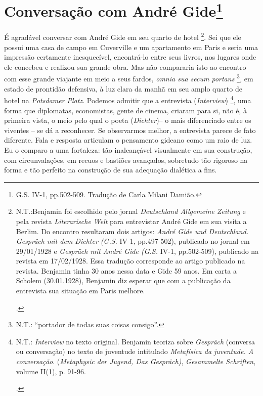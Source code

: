 \chapter{Conversação com André Gide\footnote[*]{G.S. IV-1, pp.502-509. Tradução de
  Carla Milani Damião.}}

É agradável conversar com André Gide em seu quarto de hotel \footnote{N.T.:Benjamin
  foi escolhido pelo jornal \emph{Deutschland Allgemeine Zeitung} e pela
  revista \emph{Literarische Welt} para entrevistar André Gide em sua
  visita a Berlim. Do encontro resultaram dois artigos: \emph{André Gide
  und Deutschland. Gespräch mit dem Dichter (G.S.} IV-1, pp.497-502),
  publicado no jornal em 29/01/1928 e \emph{Gespräch mit André Gide
  (G.S.} IV-1, pp.502-509), publicado na revista em 17/02/1928. Essa
  tradução corresponde ao artigo publicado na revista. Benjamin tinha 30
  anos nessa data e Gide 59 anos. Em carta a Scholem (30.01.1928),
  Benjamin diz esperar que com a publicação da entrevista sua situação
  em Paris melhore.

  .}. Sei que ele possui uma casa de campo em Cuverville e um
apartamento em Paris e seria uma impressão certamente inesquecível,
encontrá-lo entre seus livros, nos lugares onde ele concebeu e realizou
sua grande obra. Mas não compararia isto ao encontro com esse grande
viajante em meio a seus fardos, \emph{omnia sua secum portans}
\footnote{N.T.: ``portador de todas suas coisas consigo''.}\emph{,} em
estado de prontidão defensiva, à luz clara da manhã em seu amplo quarto
de hotel na \emph{Potsdamer Platz}. Podemos admitir que a entrevista
(\emph{Interview}) \footnote{N.T.: \emph{Interview} no texto original.
  Benjamin teoriza sobre \emph{Gespräch} (conversa ou conversação) no
  texto de juventude intitulado \emph{Metafísica da juventude. A
  conversação}. (\emph{Metaphysic der Jugend, Das Gespräch)},
  \emph{Gesammelte Schriften}, volume II(1), p. 91-96.

  .}, uma forma que diplomatas, economistas, gente de cinema, criaram
para si, não é, à primeira vista, o meio pelo qual o poeta
(\emph{Dichter})-- o mais diferenciado entre os viventes -- se dá a
reconhecer. Se observarmos melhor, a entrevista parece de fato
diferente. Fala e resposta articulam o pensamento gideano como um raio
de luz. Eu o comparo a uma fortaleza: tão inalcançável visualmente em
sua construção, com circunvalações, em recuos e bastiões avançados,
sobretudo tão rigoroso na forma e tão perfeito na construção de sua
adequação dialética a fins.

